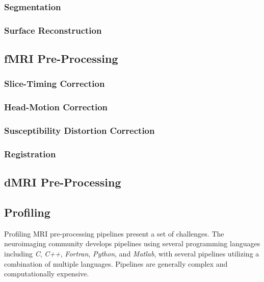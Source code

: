 \documentclass[conference]{IEEEtran}
\begin{document}
\subsubsection{Segmentation}


\subsubsection{Surface Reconstruction}


\subsection{fMRI Pre-Processing}
\subsubsection{Slice-Timing Correction}


\subsubsection{Head-Motion Correction}


\subsubsection{Susceptibility Distortion Correction}


\subsubsection{Registration}


\subsection{dMRI Pre-Processing}


\subsection{Profiling}
Profiling MRI pre-processing pipelines present a set of challenges. The neuroimaging community develops pipelines using several programming languages including \textit{C}, \textit{C++}, \textit{Fortran}, \textit{Python}, and \textit{Matlab}, with several pipelines utilizing a combination of multiple languages. Pipelines are generally complex and computationally expensive.
\end{document}
